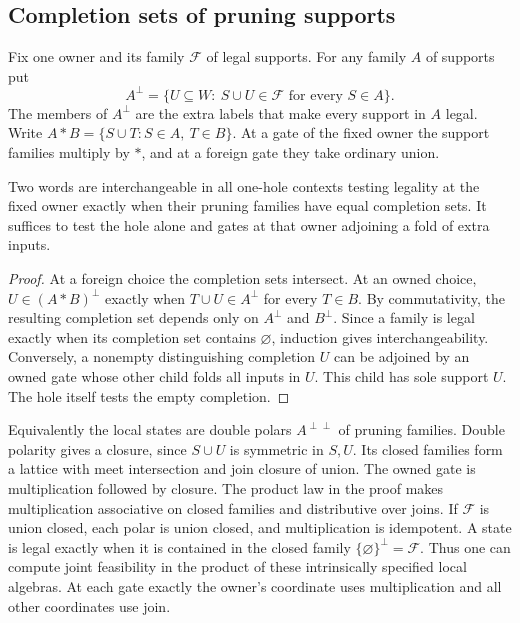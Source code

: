 \subsection{Completion sets of pruning supports}
\label{app:pruning-contexts}

Fix one owner and its family $\mathcal F$ of legal supports. For any
family $A$ of supports put
\[
 A^\perp=\{U\subseteq W:\ S\cup U\in\mathcal F\text{ for every }S\in A\}.
\]
The members of $A^\perp$ are the extra labels that make every support
in $A$ legal. Write $A*B=\{S\cup T:S\in A,\ T\in B\}$. At a gate
of the fixed owner the support families multiply by $*$, and at
a foreign gate they take ordinary union.

\begin{theorem}
\label{core:thm:pruning-contexts}
Two words are interchangeable in all one-hole contexts testing
legality at the fixed owner exactly when their pruning families
have equal completion sets. It suffices to test the hole alone
and gates at that owner adjoining a fold of extra inputs.
\end{theorem}
\begin{proof}
At a foreign choice the completion sets intersect. At an owned choice,
$U\in(A*B)^\perp$ exactly when $T\cup U\in A^\perp$ for every
$T\in B$. By commutativity, the resulting completion set depends
only on $A^\perp$ and $B^\perp$. Since a family is legal exactly
when its completion set contains $\varnothing$, induction gives
interchangeability.
Conversely, a nonempty distinguishing completion $U$ can be adjoined
by an owned gate whose other child folds all inputs in $U$. This child
has sole support $U$. The hole itself tests the empty completion.
\end{proof}

Equivalently the local states are double polars $A^{\perp\perp}$ of
pruning families. Double polarity gives a closure, since $S\cup U$
is symmetric in $S,U$. Its closed families form a lattice with meet
intersection and join closure of union. The owned gate is multiplication
followed by closure. The product law in the proof makes multiplication
associative on closed families and distributive over joins.
If $\mathcal F$ is union closed, each polar is union closed, and
multiplication is idempotent. A state is legal exactly when it is
contained in the closed family $\{\varnothing\}^\perp=\mathcal F$.
Thus one can compute joint feasibility in the product of these
intrinsically specified local algebras. At each gate exactly the
owner's coordinate uses multiplication and all other coordinates
use join.

